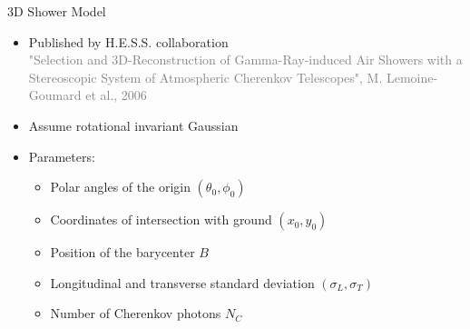 \documentclass[aspectratio=1610, 9pt]{beamer}
\begin{document}
\begin{frame}{3D Shower Model}
    \begin{minipage}{0.49\textwidth}
        \begin{itemize}
            \item Published by H.E.S.S. collaboration \\ \tiny{{\textcolor{gray}{"Selection and 3D-Reconstruction of Gamma-Ray-induced Air Showers with a Stereoscopic System of Atmospheric Cherenkov Telescopes", M. Lemoine-Goumard et al., 2006}}} \normalsize
            \item Assume rotational invariant Gaussian
            \item Parameters: \begin{itemize}
                    \item Polar angles of the origin $(\theta_0,\phi_0)$
                    \item Coordinates of intersection with ground $(x_0,y_0)$
                    \item Position of the barycenter $B$
                    \item Longitudinal and transverse standard deviation $(\sigma_L, \sigma_T)$
                    \item Number of Cherenkov photons $N_C$
                \end{itemize}
        \end{itemize}
    \end{minipage}
    \hfill
    \begin{minipage}{0.5\textwidth}
        \centering
    \end{minipage}
\end{frame}
\end{document}
